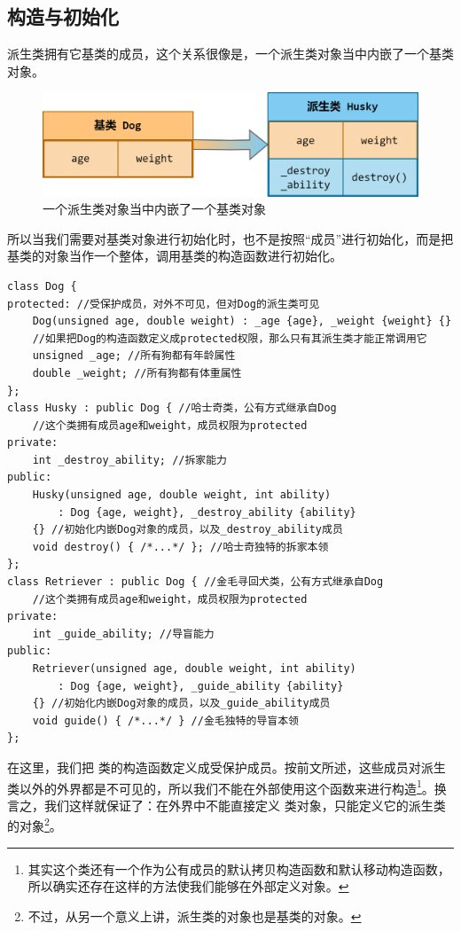 \subsection*{构造与初始化}
派生类拥有它基类的成员，这个关系很像是，一个派生类对象当中内嵌了一个基类对象。
\begin{figure}[htbp]
    \centering
    \includegraphics[width=.8\textwidth]{images/generalized_parts/09_built_in_base_class_object_in_derived_class.drawio.png}
    \caption{一个派生类对象当中内嵌了一个基类对象}
\end{figure}
所以当我们需要对基类对象进行初始化时，也不是按照``成员''进行初始化，而是把基类的对象当作一个整体，调用基类的构造函数进行初始化。\par
\begin{lstlisting}
class Dog {
protected: //受保护成员，对外不可见，但对Dog的派生类可见
    Dog(unsigned age, double weight) : _age {age}, _weight {weight} {}
    //如果把Dog的构造函数定义成protected权限，那么只有其派生类才能正常调用它
    unsigned _age; //所有狗都有年龄属性
    double _weight; //所有狗都有体重属性
};
class Husky : public Dog { //哈士奇类，公有方式继承自Dog
    //这个类拥有成员age和weight，成员权限为protected
private:
    int _destroy_ability; //拆家能力
public:
    Husky(unsigned age, double weight, int ability)
        : Dog {age, weight}, _destroy_ability {ability}
    {} //初始化内嵌Dog对象的成员，以及_destroy_ability成员
    void destroy() { /*...*/ }; //哈士奇独特的拆家本领
};
class Retriever : public Dog { //金毛寻回犬类，公有方式继承自Dog
    //这个类拥有成员age和weight，成员权限为protected
private:
    int _guide_ability; //导盲能力
public:
    Retriever(unsigned age, double weight, int ability)
        : Dog {age, weight}, _guide_ability {ability}
    {} //初始化内嵌Dog对象的成员，以及_guide_ability成员
    void guide() { /*...*/ } //金毛独特的导盲本领
};
\end{lstlisting}\par
在这里，我们把 \lstinline@Dog@ 类的构造函数定义成受保护成员。按前文所述，这些成员对派生类以外的外界都是不可见的，所以我们不能在外部使用这个函数来进行构造\footnote{其实这个类还有一个作为公有成员的默认拷贝构造函数和默认移动构造函数，所以确实还存在这样的方法使我们能够在外部定义对象。}。换言之，我们这样就保证了：在外界中不能直接定义 \lstinline@Dog@ 类对象，只能定义它的派生类的对象\footnote{不过，从另一个意义上讲，派生类的对象也是基类的对象。}。\par
